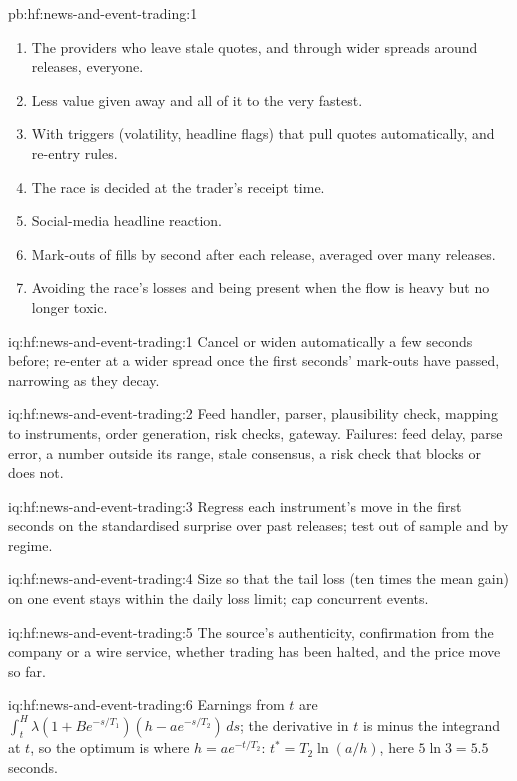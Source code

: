 \begin{solution}{pb:hf:news-and-event-trading:1}
\begin{enumerate}
\item The providers who leave stale quotes, and through wider spreads around releases, everyone.
\item Less value given away and all of it to the very fastest.
\item With triggers (volatility, headline flags) that pull quotes automatically, and re-entry rules.
\item The race is decided at the trader's receipt time.
\item Social-media headline reaction.
\item Mark-outs of fills by second after each release, averaged over many releases.
\item Avoiding the race's losses and being present when the flow is heavy but no longer toxic.
\end{enumerate}
\end{solution}

\begin{solution}{iq:hf:news-and-event-trading:1}
Cancel or widen automatically a few seconds before; re-enter at a wider spread once the first seconds' mark-outs have passed, narrowing as they
decay.
\end{solution}

\begin{solution}{iq:hf:news-and-event-trading:2}
Feed handler, parser, plausibility check, mapping to instruments, order generation, risk checks, gateway. Failures: feed delay, parse error, a
number outside its range, stale consensus, a risk check that blocks or does not.
\end{solution}

\begin{solution}{iq:hf:news-and-event-trading:3}
Regress each instrument's move in the first seconds on the standardised surprise over past releases; test out of sample and by regime.
\end{solution}

\begin{solution}{iq:hf:news-and-event-trading:4}
Size so that the tail loss (ten times the mean gain) on one event stays within the daily loss limit; cap concurrent events.
\end{solution}

\begin{solution}{iq:hf:news-and-event-trading:5}
The source's authenticity, confirmation from the company or a wire service, whether trading has been halted, and the price move so far.
\end{solution}

\begin{solution}{iq:hf:news-and-event-trading:6}
Earnings from $t$ are $\int_t^H\lambda(1+Be^{-s/T_1})(h-a e^{-s/T_2})\,ds$; the derivative in $t$ is minus the integrand at $t$, so the optimum is
where $h=a e^{-t/T_2}$: $t^\ast=T_2\ln(a/h)$, here $5\ln3=5.5$ seconds.
\end{solution}
